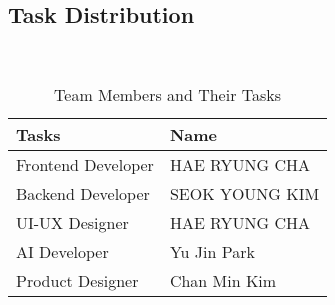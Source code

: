 \documentclass[conference]{IEEEtran}
\begin{document}
\subsection{Task Distribution}
\\
\begin{table} [h]
\centering
\caption{Team Members and Their Tasks}
\renewcommand{\arraystretch}{1.5}
\begin{tabular}{| p{3cm}|p{3cm}|}

\hline
Tasks & Name \\

\hline
Frontend Developer & HAE RYUNG CHA\\

\hline
Backend Developer & SEOK YOUNG KIM\\

\hline
UI-UX Designer & HAE RYUNG CHA\\

\hline
AI Developer & Yu Jin Park\\

\hline
Product Designer & Chan Min Kim\\

\hline
\end{tabular}
\end{table}

 

\end{document}

